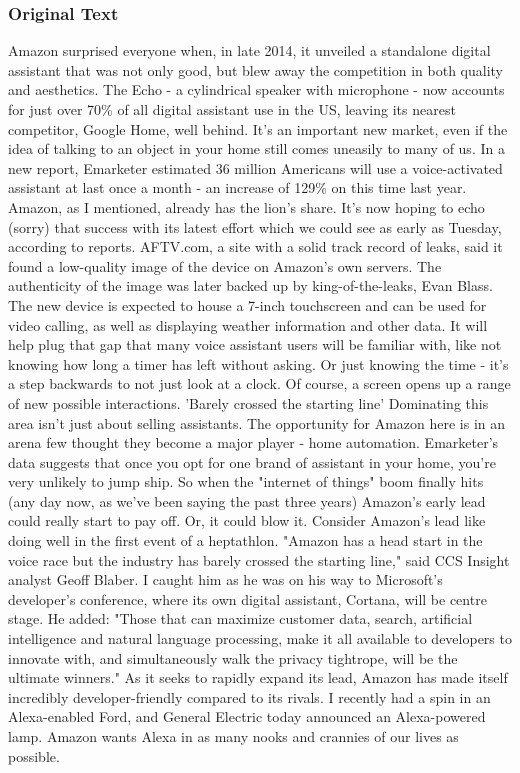 \subsubsection{Original Text}
Amazon surprised everyone when, in late 2014, it unveiled a standalone digital assistant that was not only good, but blew away the competition in both quality and aesthetics.
The Echo - a cylindrical speaker with microphone - now accounts for just over 70\% of all digital assistant use in the US, leaving its nearest competitor, Google Home, well behind.
It's an important new market, even if the idea of talking to an object in your home still comes uneasily to many of us.
In a new report, Emarketer estimated 36 million Americans will use a voice-activated assistant at last once a month - an increase of 129\% on this time last year.
Amazon, as I mentioned, already has the lion's share. It's now hoping to echo (sorry) that success with its latest effort which we could see as early as Tuesday, according to reports.
AFTV.com, a site with a solid track record of leaks, said it found a low-quality image of the device on Amazon's own servers.
The authenticity of the image was later backed up by king-of-the-leaks, Evan Blass. 
The new device is expected to house a 7-inch touchscreen and can be used for video calling, as well as displaying weather information and other data.
It will help plug that gap that many voice assistant users will be familiar with, like not knowing how long a timer has left without asking. Or just knowing the time - it's a step backwards to not just look at a clock. Of course, a screen opens up a range of new possible interactions.
'Barely crossed the starting line'
Dominating this area isn't just about selling assistants. The opportunity for Amazon here is in an arena few thought they become a major player - home automation. Emarketer's data suggests that once you opt for one brand of assistant in your home, you're very unlikely to jump ship. So when the "internet of things" boom finally hits (any day now, as we've been saying the past three years) Amazon's early lead could really start to pay off.
Or, it could blow it. Consider Amazon's lead like doing well in the first event of a heptathlon.
"Amazon has a head start in the voice race but the industry has barely crossed the starting line," said CCS Insight analyst Geoff Blaber. I caught him as he was on his way to Microsoft's developer's conference, where its own digital assistant, Cortana, will be centre stage.
He added: "Those that can maximize customer data, search, artificial intelligence and natural language processing, make it all available to developers to innovate with, and simultaneously walk the privacy tightrope, will be the ultimate winners."
As it seeks to rapidly expand its lead, Amazon has made itself incredibly developer-friendly compared to its rivals. I recently had a spin in an Alexa-enabled Ford, and General Electric today announced an Alexa-powered lamp. Amazon wants Alexa in as many nooks and crannies of our lives as possible.

